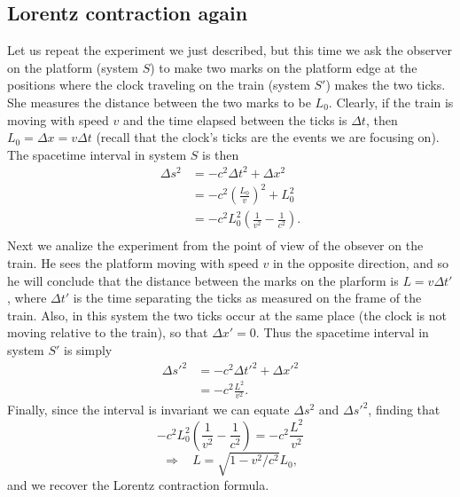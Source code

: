\documentclass[11pt, a4paper,oneside,openright]{book}
\numberwithin{equation}{section}
\begin{document}
\subsection{Lorentz contraction again}

Let us repeat the experiment we just described, but this time we ask the observer on the platform (system $S$) to make two marks on the platform edge at the positions where the clock traveling on the train (system $S'$) makes the two ticks. She measures the distance between the two marks to be $L_0$. Clearly, if the train is moving with speed $v$ and the time elapsed between the ticks is $\Delta t$, then $L_0=\Delta x=v\Delta t$ (recall that the clock's ticks are the events we are focusing on). The spacetime interval in system $S$ is then
\begin{equation}
\begin{split}
\Delta s^2&=-c^2\Delta t^2+\Delta x^2\\
&=-c^2\left(\frac{L_0}{v}\right)^2+L_0^2\\
&=-c^2L_0^2\left(\frac{1}{v^2}-\frac{1}{c^2}\right).\\
\end{split}
\end{equation}
Next we analize the experiment from the point of view of the obsever on the train. He sees the platform moving with speed $v$ in the opposite direction, and so he will conclude that the distance between the marks on the plarform is $L=v\Delta t'$, where $\Delta t'$ is the time separating the ticks as measured on the frame of the train. Also, in this system the two ticks occur at the same place (the clock is not moving relative to the train), so that $\Delta x'=0$. Thus the spacetime interval in system $S'$ is simply
\begin{equation}
\begin{split}
\Delta s'^2&=-c^2\Delta t'^2+\Delta x'^2\\
&=-c^2\frac{L^2}{v^2}.
\end{split}
\end{equation}
Finally, since the interval is invariant we can equate $\Delta s^2$ and $\Delta s'^2$, finding that
\begin{equation}
-c^2L_0^2\left(\frac{1}{v^2}-\frac{1}{c^2}\right)=-c^2\frac{L^2}{v^2}
\end{equation}
\begin{equation}
\Rightarrow~~~~L=\sqrt{1-v^2/c^2}L_0,
\end{equation}
and we recover the Lorentz contraction formula.
\end{document}
